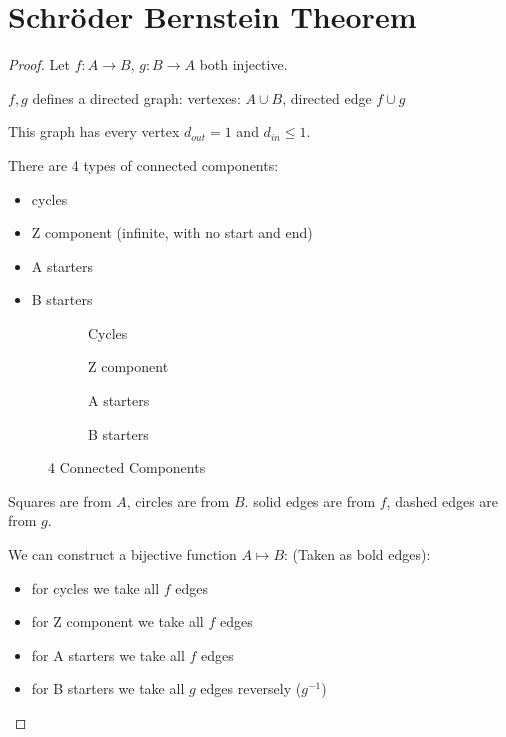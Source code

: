\section{Schr\"{o}der Bernstein
Theorem}
\begin{proof}

Let \(f: A\rightarrow B\), \(g: B \rightarrow A\) both injective.

\(f, g\) defines a directed graph: vertexes: \(A\cup B\), directed edge
\(f \cup g\)

This graph has every vertex \(d_{out} = 1\) and \(d_{in} \le 1\).

There are 4 types of connected components:

\begin{itemize}
\item
  cycles
\item
  Z component (infinite, with no start and end)
\item
  A starters
\item
  B starters
\end{itemize}

\begin{figure}[ht]
\centering
\begin{subfigure}[c]{0.3\textwidth}
         \centering
         \def\svgwidth{0.75\textwidth}
        
         \caption{Cycles}
     \end{subfigure}
     \begin{subfigure}[c]{0.3\textwidth}
         \centering
         \def\svgwidth{\textwidth}
        
         \caption{Z component}
     \end{subfigure}

\begin{subfigure}[c]{0.3\textwidth}
         \centering
         \def\svgwidth{\textwidth}
        
         \caption{A starters}
     \end{subfigure}
     \begin{subfigure}[c]{0.3\textwidth}
         \centering
         \def\svgwidth{\textwidth}
        
         \caption{B starters}
     \end{subfigure}
     
\caption{4 Connected Components}
\end{figure}

Squares are from \(A\), circles are from \(B\). solid edges are
from \(f\), dashed edges are from \(g\).

We can construct a bijective function \(A \mapsto B\): (Taken as bold edges):

\begin{itemize}
\item
  for cycles we take all \(f\) edges
\item
  for Z component we take all \(f\) edges
\item
  for A starters we take all \(f\) edges
\item
  for B starters we take all \(g\) edges reversely (\(g^{-1}\))
\end{itemize}

\end{proof}